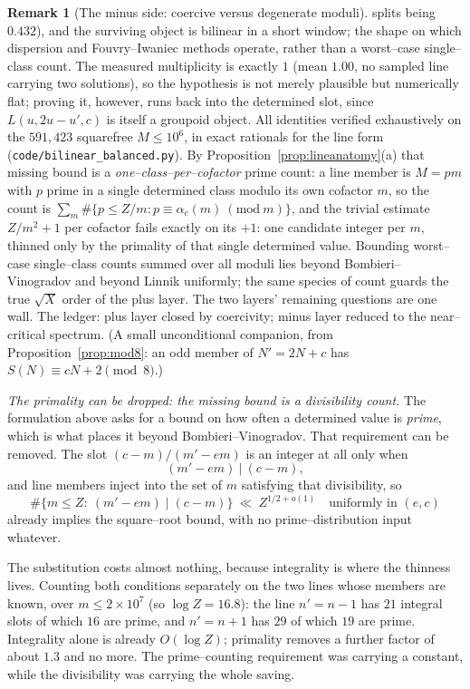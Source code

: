 \documentclass[11pt]{article}
\theoremstyle{definition}
\newtheorem{remark}[theorem]{Remark}
\begin{document}
\begin{remark}[The minus side: coercive versus degenerate moduli]
splits being $0.432$), and the surviving object is bilinear in a short window; the shape on which
dispersion and Fouvry--Iwaniec methods operate, rather than a worst--case single--class count. The
measured multiplicity is exactly $1$ (mean $1.00$, no sampled line carrying two solutions), so the
hypothesis is not merely plausible but numerically flat; proving it, however, runs back into the
determined slot, since $L(u,2u-u',c)$ is itself a groupoid object. All identities verified
exhaustively on the $591{,}423$ squarefree $M\le10^6$, in exact rationals for the line form
(\texttt{code/bilinear\_balanced.py}). By
Proposition~\ref{prop:lineanatomy}(a) that missing bound is a \emph{one--class--per--cofactor}
prime count: a line member is $M=pm$ with $p$ prime in a single determined class modulo its own
cofactor $m$, so the count is $\sum_m\#\{p\le Z/m:p\equiv\alpha_c(m)\ (\mathrm{mod}\ m)\}$, and the
trivial estimate $Z/m^2+1$ per cofactor fails exactly on its $+1$: one candidate integer per $m$,
thinned only by the primality of that single determined value. Bounding worst--case single--class
counts summed over all moduli lies beyond Bombieri--Vinogradov and beyond Linnik uniformly; the
same species of count guards the true $\sqrt X$ order of the plus layer. The two layers' remaining
questions are one wall. The ledger: plus layer closed by coercivity; minus layer reduced to the
near--critical spectrum. (A small
unconditional companion, from Proposition~\ref{prop:mod8}: an odd member of $N'=2N+c$ has
$S(N)\equiv cN+2\pmod8$.)
\end{remark}

\emph{The primality can be dropped: the missing bound is a divisibility count.} The formulation above asks for a bound on how often a determined value is \emph{prime}, which is
what places it beyond Bombieri--Vinogradov. That requirement can be removed. The slot
$(c-m)/(m'-em)$ is an integer at all only when
\[ (m'-em)\ \big|\ (c-m), \]
and line members inject into the set of $m$ satisfying that divisibility, so
\[ \#\{m\le Z:\ (m'-em)\mid(c-m)\}\ \ll\ Z^{1/2+o(1)}\quad\text{uniformly in }(e,c) \]
already implies the square--root bound, with no prime--distribution input whatever.

The substitution costs almost nothing, because integrality is where the thinness lives.
Counting both conditions separately on the two lines whose members are known, over $m\le2\times10^7$
(so $\log Z=16.8$): the line $n'=n-1$ has $21$ integral slots of which $16$ are prime, and
$n'=n+1$ has $29$ of which $19$ are prime. Integrality alone is already $O(\log Z)$; primality
removes a further factor of about $1.3$ and no more. The prime--counting requirement was carrying
a constant, while the divisibility was carrying the whole saving.
\end{document}

